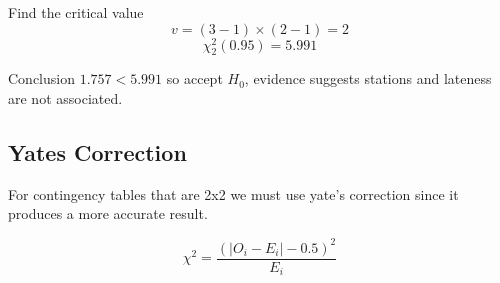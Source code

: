 \begin{example}
        \begin{step}{Find the critical value}
        $$v = (3-1)\times(2-1) = 2$$
        $$\chi^2_2(0.95) = 5.991$$
        \end{step}
        
        \begin{step}{Conclusion}
        $1.757 < 5.991$ so accept $H_0$, evidence suggests stations and lateness are not associated.
        \end{step}
        
        \end{example}
    
    \newpage
    \subsection{Yates Correction}
        For contingency tables that are 2x2 we must use yate's correction since it produces a more accurate result.
        
        $$
        \chi^2 = \frac{(|O_i - E_i| - 0.5)^2}{E_i}
        $$
    
